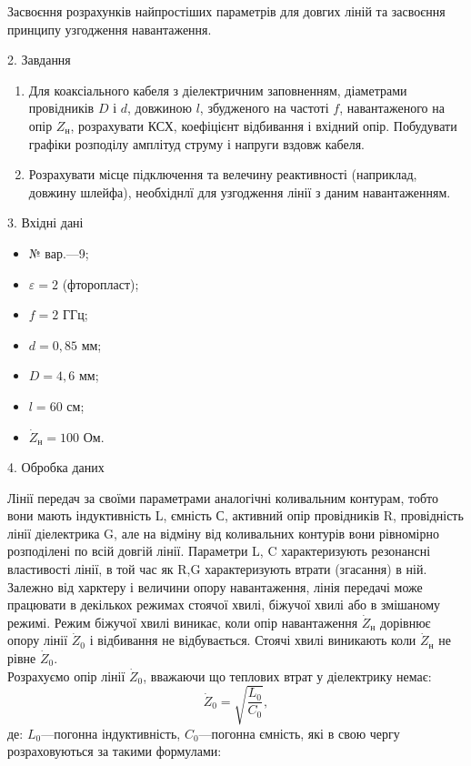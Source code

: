 \documentclass[fontsize=14pt,a4paper]{scrartcl}
\begin{document}
 Засвоєння розрахунків найпростіших параметрів для довгих ліній та засвоєння принципу узгодження навантаження.

\begin{center}
\Large 2. Завдання\\
\end{center}
\begin{enumerate}
\item Для коаксіального кабеля з діелектричним заповненням, діаметрами провідників $D$ і $d$, довжиною $l$, збудженого на частоті $f$, навантаженого на опір $Z_{\text{н}}$, розрахувати КСХ, коефіцієнт відбивання і вхідний опір. Побудувати графіки розподілу амплітуд струму і напруги вздовж кабеля.
\item Розрахувати місце підключення та велечину реактивності (наприклад, довжину шлейфа), необхіднлї для узгодження лінії з даним навантаженням.
\end{enumerate}

\begin{center}
\Large 3. Вхідні дані\\
\end{center}

\begin{itemize}
\item № вар.---9;
\item $\varepsilon=2$ (фторопласт);
\item $f=2$ ГГц;
\item $d=0,85$ мм;
\item $D=4,6$ мм;
\item $l=60$ см;
\item $\dot Z_{\text{н}}=100$ Ом.
\end{itemize}
\newpage

\begin{center}
\Large 4. Обробка даних\\
\end{center}

Лінії передач за своїми параметрами аналогічні коливальним контурам, тобто вони мають індуктивність L, ємність С, активний опір провідників R, провідність лінії діелектрика G, але на відміну від коливальних контурів вони рівномірно розподілені по всій довгій лінії. Параметри L, C характеризують резонансні властивості лінії, в той час як R,G характеризують втрати (згасання) в ній.\\

Залежно від харктеру і величини опору навантаження, лінія передачі може працювати в декількох режимах стоячої хвилі, біжучої хвилі або в змішаному режимі. Режим біжучої хвилі виникає, коли опір навантаження $\dot Z_{\text{н}}$ дорівнює опору лінії $\dot Z_0$ і відбивання не відбувається. Стоячі хвилі виникають коли $\dot Z_{\text{н}}$ не рівне  $\dot Z_0$.\\

Розрахуємо опір лінії $\dot Z_0$, вважаючи що теплових втрат у діелектрику немає:
\begin{equation}
\dot Z_0=\sqrt{\dfrac{L_0}{C_0}},
\end{equation}
де: $L_0$---погонна індуктивність, $C_0$---погонна ємність, які в свою чергу розраховуються за такими формулами:
\end{document}
